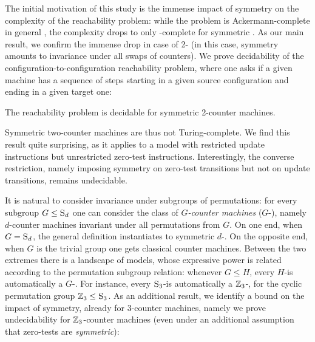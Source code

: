 \vspace{-3mm}

The initial motivation of this study is the immense impact of symmetry
on the complexity of the \vass reachability problem:
while the problem is {\sc Ackermann}-complete in general \cite{LS19,CO21,L21},
the complexity drops to
only \pspace-complete for symmetric \vass \cite{KL25}.
As our main result, we confirm the immense drop in case of 
2-
(in this case, symmetry amounts to invariance under all swaps of 
counters).
We prove decidability of the configuration-to-configuration reachability
problem, where one asks if a given machine has a sequence of steps
starting in a given source configuration and ending in
a given target one:

\begin{theorem} \label{thm:main}
The reachability problem is decidable for symmetric 2-counter machines.
\end{theorem}

Symmetric two-counter machines are thus not Turing-complete.
We find this result quite surprising, as it applies to a model
with restricted update instructions but unrestricted zero-test instructions.
% 
Interestingly, the converse restriction, namely imposing symmetry on
zero-test transitions but not on update transitions, remains 
undecidable.

\smallskip

It is natural to consider invariance under subgroups
of permutations: for every subgroup $G\leq \textsc{S}_{d}$
one can consider the class of \emph{$G$-counter machines}
($G$-), namely 
$d$-counter machines invariant under all permutations from $G$.
On one end, 
when $G=\textsc{S}_{d}$, the general definition instantiates to 
symmetric $d$-.
On the opposite end, when $G$ is the trivial group one gets classical counter
machines.
Between the two extremes there is a landscape of models, 
whose expressive power is related according to the permutation subgroup relation:
whenever $G\leq H$, every $H$-\cm is automatically a
$G$-\cm.
For instance, every $\textsc{S}_{3}$-\cm is automatically
a $\mathbb{Z}_{3}$-\cm, for the cyclic 
permutation group $\mathbb{Z}_{3} \leq \textsc{S}_{3}$.
As an additional result, we identify a bound on the impact of symmetry,
already for 3-counter machines, namely we prove undecidability 
for $\mathbb{Z}_{3}$-counter machines
(even under an additional assumption that zero-tests are \emph{symmetric}):


